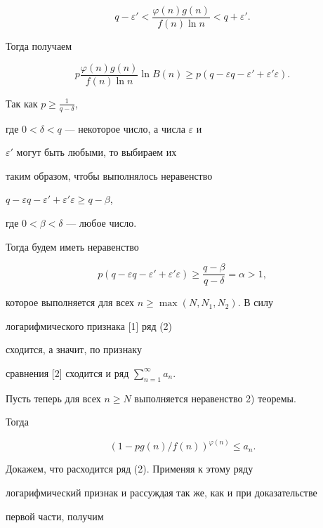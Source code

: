 \begin{pf}
$$


q-\varepsilon ' < \frac{\varphi (n)g(n)}{f(n)\ln n}< q+\varepsilon '.


$$


Тогда получаем


$$


p \frac{\varphi (n) g(n)}{f(n)\ln n} \ln B(n)\geq


p (q-\varepsilon q - \varepsilon '+\varepsilon ' \varepsilon).


$$


Так как $p\geq \frac{1}{q-\delta}$,


где $0<\delta <q$ --- некоторое число, а числа $\varepsilon$ и


$\varepsilon '$ могут быть любыми, то выбираем их


таким образом, чтобы выполнялось неравенство


$q-\varepsilon q -\varepsilon '+


\varepsilon ' \varepsilon \geq q-\beta$,


где $0< \beta < \delta $ --- любое число.


Тогда будем иметь неравенство


$$


p(q-\varepsilon q -\varepsilon '+


\varepsilon ' \varepsilon) \geq \frac{q-\beta}{q-\delta}=\alpha >1,


$$


которое выполняется для всех $n \geq \max(N, N_1, N_2)$. В силу


логарифмического признака [1] ряд (2)


сходится, а значит, по признаку


сравнения [2] сходится и ряд $\sum\limits_{n=1}^{\infty}a_n$.





Пусть теперь для всех $n \geq N$ выполняется неравенство 2) теоремы.


Тогда


$$


(1-p g(n)/f(n)) ^{\varphi (n)}\leq a_n.


$$





Докажем, что расходится ряд (2). Применяя к этому ряду


логарифмический признак и рассуждая так же, как и при доказательстве


первой части, получим



\end{pf}
